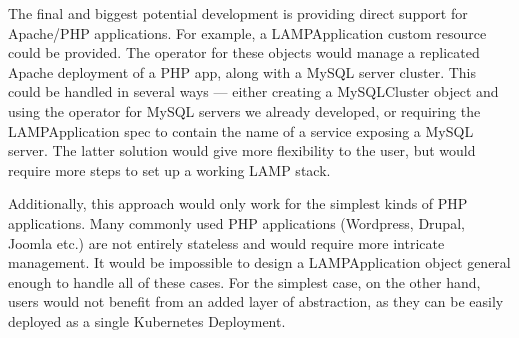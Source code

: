 The final and biggest potential development is providing direct support for Apache/PHP applications.
For example, a LAMPApplication custom resource could be provided. The operator for these objects
would manage a replicated Apache deployment of a PHP app, along with a MySQL server cluster.
This could be handled in several ways --- either creating a MySQLCluster object and using the
operator for MySQL servers we already developed, or requiring the LAMPApplication spec to contain
the name of a service exposing a MySQL server. The latter solution would give more flexibility to
the user, but would require more steps to set up a working LAMP stack.

Additionally, this approach would only work for the simplest kinds of PHP applications.
Many commonly used PHP applications (Wordpress, Drupal, Joomla etc.) are not entirely stateless and
would require more intricate management. It would be impossible to design a LAMPApplication object
general enough to handle all of these cases. For the simplest case, on the other
hand, users would not benefit from an added layer of abstraction, as they can be easily deployed as a single
Kubernetes Deployment.
